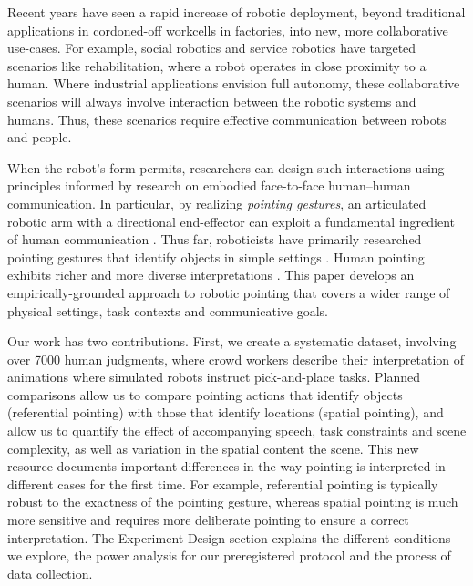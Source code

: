 Recent years have seen a rapid increase of robotic deployment, beyond traditional applications in cordoned-off workcells in factories, into new, more collaborative use-cases. For example, social robotics and service robotics have targeted scenarios like rehabilitation, where a robot operates in close proximity to a human. Where industrial applications envision full autonomy, these collaborative scenarios will always involve interaction between the robotic systems and humans. Thus, these scenarios require effective communication between robots and people.

When the robot's form permits, researchers can design such interactions using principles informed by research on embodied face-to-face human--human communication.  In particular, by realizing \emph{pointing gestures}, an articulated robotic arm with a directional end-effector can exploit a fundamental ingredient of human communication \cite{kita2003pointing}.  Thus far, roboticists have primarily researched pointing gestures that identify objects in simple settings \cite[a.o.]{han2018placing,holladay2014legible,zhao2016experimental}.  Human pointing exhibits richer and more diverse interpretations \cite{kendon:2004}.  This paper develops an empirically-grounded approach to robotic pointing that covers a wider range of physical settings, task contexts and communicative goals.

Our work has two contributions.  First, we create a systematic dataset, involving over 7000 human judgments, where crowd workers describe their interpretation of animations where simulated robots instruct pick-and-place tasks.  Planned comparisons allow us to compare pointing actions that identify objects (referential pointing) with those that identify locations (spatial pointing), and allow us to quantify the effect of accompanying speech, task constraints and scene complexity, as well as variation in the spatial content the scene.  This new resource documents important differences in the way pointing is interpreted in different cases for the first time.  For example, referential pointing is typically robust to the exactness of the pointing gesture, whereas spatial pointing is much more sensitive and requires more deliberate pointing to ensure a correct interpretation.  The Experiment Design section explains the different conditions we explore, the power analysis for our preregistered protocol and the process of data collection. 


